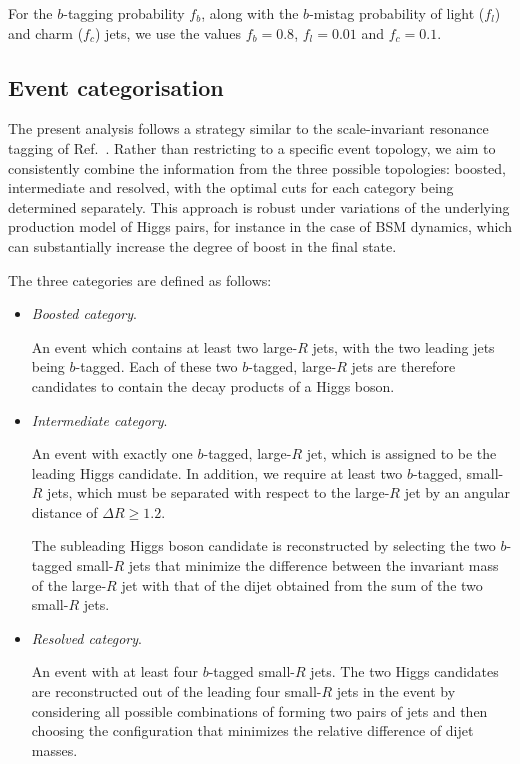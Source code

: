 For the $b$-tagging probability $f_b$, along with
the $b$-mistag probability of light ($f_l$) and charm ($f_c$) jets,
we use the values $f_b=0.8$, $f_l=0.01$
and  $f_c=0.1$.


\subsection{Event categorisation}
\label{sec:categorisation}

The present analysis follows a strategy similar to the
scale-invariant resonance tagging of Ref.~\cite{Gouzevitch:2013qca}.
%
Rather than restricting to a specific event topology,
we aim to consistently combine the information from
the three possible topologies: boosted, intermediate and
resolved, with the optimal cuts for each category being determined
separately.
%
This approach is robust
under variations of
the underlying production model of Higgs pairs,
for instance in the case of
BSM dynamics, which can substantially increase
the degree of boost in the final state.


The three categories are defined as follows:
\begin{itemize}
\item {\it Boosted category}.

  An event which
  contains at least two large-$R$ jets, with the two leading jets
 being $b$-tagged.
 Each of these two  $b$-tagged, large-$R$ jets are 
 therefore candidates
 to contain the decay products of a Higgs boson.

\item {\it Intermediate category}.

  An event with exactly one  $b$-tagged, large-$R$ jet, which
  is assigned to be the leading Higgs candidate.
  In addition, we require at least two $b$-tagged, small-$R$ jets,
  which must be separated with respect to the large-$R$ jet
  by an angular distance of $\Delta R\ge 1.2$.
    
  The subleading Higgs boson candidate is reconstructed
  by selecting the two $b$-tagged small-$R$ jets that minimize the difference
  between the invariant mass of the large-$R$ jet
  with that of the dijet obtained
  from the sum of the two small-$R$ jets.
  
\item {\it Resolved category}.

  
 An event with at least
  four $b$-tagged small-$R$ jets.
  The two Higgs candidates are reconstructed out of the
  leading four small-$R$ jets in the event
  by considering all possible combinations of forming two pairs of jets
  and then choosing the configuration that minimizes the relative difference of
  dijet masses.
  
\end{itemize}


